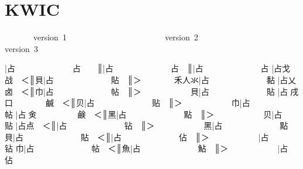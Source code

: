 
\FPmul{}%
\FPmul{}\begin{multicols}{2}\end{multicols}
\section{KWIC
}
\begin{multicols}{2}\end{multicols}\begingroup\mktsObeyAllLines{}

\begingroup\mktsStyleCode{}       version 1                        version 2                        version 3

{\cjk{}{\cnsym{}　　　　　　}}|{\cjk{}占{\cnsym{}　　　　　　　}占{\cnsym{}　　}}║{\cjk{}{\cnsym{}　　　　　　　}}|{\cjk{}占{\cnsym{}　　　　　　　}占{\cnsym{}　}}║{\cjk{}{\cnsym{}　　　　　　　　}}|{\cjk{}占{\cnsym{}　　　　　　　}占} 
{\cjk{}{\cnsym{}　　　　　　}}|{\cjk{}占戈{\cnsym{}　　　　　　}战{\cnsym{}　}＜}║{\cjk{}{\cnsym{}　　　　　　}貝}|{\cjk{}占{\cnsym{}　　　　　　　}貼{\cnsym{}　}}║{\cjk{}＞{\cnsym{}　　　　}禾人氺}|{\cjk{}占{\cnsym{}　　　　　　　}黏} 
{\cjk{}{\cnsym{}　　　　　　}}|{\cjk{}占乂{\cnsym{}　　　　　　}卤{\cnsym{}　}＜}║{\cjk{}{\cnsym{}　　　　　　}巾}|{\cjk{}占{\cnsym{}　　　　　　　}帖{\cnsym{}　}}║{\cjk{}＞{\cnsym{}　　　　　　}貝}|{\cjk{}占{\cnsym{}　　　　　　　}貼} 
{\cjk{}{\cnsym{}　　　　　　}}|{\cjk{}占{\cnxb{}𠂭}戌口{\cnsym{}　　　　}鹹{\cnsym{}　}＜}║{\cjk{}{\cnsym{}　　　　　　}贝}|{\cjk{}占{\cnsym{}　　　　　　　}贴{\cnsym{}　}}║{\cjk{}＞{\cnsym{}　　　　　　}巾}|{\cjk{}占{\cnsym{}　　　　　　　}帖} 
{\cjk{}{\cnsym{}　　　　　　}}|{\cjk{}占{\cnxb{}𠂭}{\cnxa{}㑒}{\cnsym{}　　　　　}鹸{\cnsym{}　}＜}║{\cjk{}{\cnsym{}　　　　　　}黑}|{\cjk{}占{\cnsym{}　　　　　　　}點{\cnsym{}　}}║{\cjk{}＞{\cnsym{}　　　　　　}贝}|{\cjk{}占{\cnsym{}　　　　　　　}贴} 
{\cjk{}{\cnsym{}　　　　　　}}|{\cjk{}占点{\cnsym{}　}＜}║{\cjk{}{\cnsym{}　　　　　　}}|{\cjk{}占{\cnsym{}　　　　　　　}钻{\cnsym{}　}}║{\cjk{}＞{\cnsym{}　　　　　　}黑}|{\cjk{}占{\cnsym{}　　　　　　　}點} 
{\cjk{}{\cnsym{}　　　　　}貝}|{\cjk{}占{\cnsym{}　　　　　　　}貼{\cnsym{}　}＜}║{\cjk{}{\cnsym{}　　　　　　}}|{\cjk{}占{\cnsym{}　　　　　　　}佔{\cnsym{}　}}║{\cjk{}＞{\cnsym{}　　　　　　}}|{\cjk{}占{\cnsym{}　　　　　　　}钻} 
{\cjk{}{\cnsym{}　　　　　}巾}|{\cjk{}占{\cnsym{}　　　　　　　}帖{\cnsym{}　}＜}║{\cjk{}{\cnsym{}　　　　　　}魚}|{\cjk{}占{\cnsym{}　　　　　　　}鮎{\cnsym{}　}}║{\cjk{}＞{\cnsym{}　　　　　　}}|{\cjk{}占{\cnsym{}　　　　　　　}佔} 
